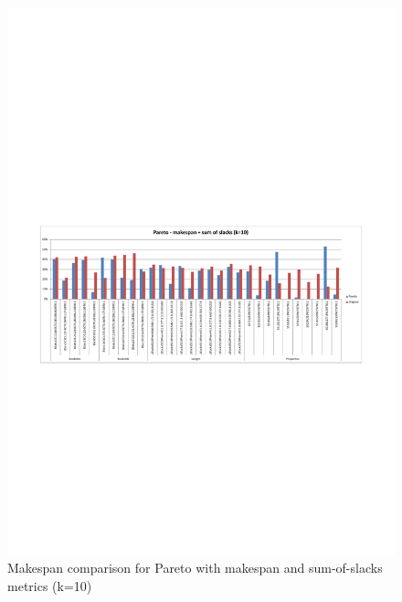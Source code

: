 \documentclass[]{article}
\begin{document}
\begin{figure}
\centering
\includegraphics[width=\textwidth]{subset-benchmark-makespan.pdf}
\caption{Makespan comparison for Pareto with makespan and sum-of-slacks metrics (k=10)}
\label{fig:subset-benchmark-makespan}
\end{figure}
\end{document}
